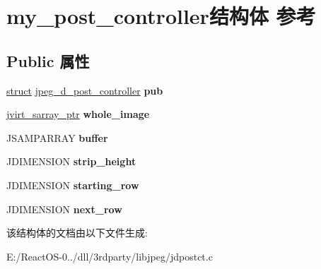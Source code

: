 \hypertarget{structmy__post__controller}{}\section{my\+\_\+post\+\_\+controller结构体 参考}
\label{structmy__post__controller}
\subsection*{Public 属性}
\begin{DoxyCompactItemize}
\item 
\mbox{\label{structmy__post__controller_a4618ce845c38c4c563bdd28af061b727}} 
\hyperlink{interfacestruct}{struct} \hyperlink{structjpeg__d__post__controller}{jpeg\+\_\+d\+\_\+post\+\_\+controller} {\bfseries pub}
\item 
\mbox{\label{structmy__post__controller_ac2336623f2e802993b35b7db30053b68}} 
\hyperlink{structjvirt__sarray__control}{jvirt\+\_\+sarray\+\_\+ptr} {\bfseries whole\+\_\+image}
\item 
\mbox{\label{structmy__post__controller_aa571ce1fd2b5171a40d3b18d1496a2cf}} 
J\+S\+A\+M\+P\+A\+R\+R\+AY {\bfseries buffer}
\item 
\mbox{\label{structmy__post__controller_a50ed0e70f9acab0995bbffb3aef6e9aa}} 
J\+D\+I\+M\+E\+N\+S\+I\+ON {\bfseries strip\+\_\+height}
\item 
\mbox{\label{structmy__post__controller_a1e762395815d8f552d1a412cb5201575}} 
J\+D\+I\+M\+E\+N\+S\+I\+ON {\bfseries starting\+\_\+row}
\item 
\mbox{\label{structmy__post__controller_a9aa9e3077c24ae10e47972c1955c6d38}} 
J\+D\+I\+M\+E\+N\+S\+I\+ON {\bfseries next\+\_\+row}
\end{DoxyCompactItemize}


该结构体的文档由以下文件生成\+:\begin{DoxyCompactItemize}
\item 
E\+:/\+React\+O\+S-\/0../dll/3rdparty/libjpeg/jdpostct.\+c\end{DoxyCompactItemize}
